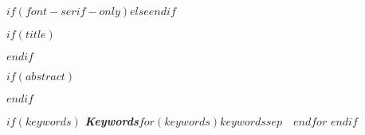$if(font-serif-only)$$else$\allsectionsfont{\sffamily}$endif$

$if(title)$
\maketitle
$endif$

$if(abstract)$
\begin{abstract}
$abstract$
\end{abstract}
$endif$

$if(keywords)$
\textbf{\textit{Keywords}}\quad $for(keywords)$$keywords$$sep$~\textbullet~$endfor$
$endif$

